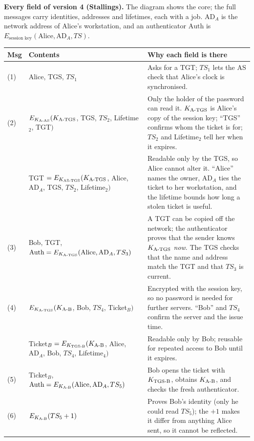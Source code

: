 \textbf{Every field of version 4 (Stallings).} The diagram shows the core; the full messages carry identities, addresses and lifetimes, each with a job. $\text{AD}_A$ is the network address of Alice's workstation, and an authenticator $\text{Auth}$ is $E_{\text{session key}}(\text{Alice}, \text{AD}_A, TS)$.
\begin{center}\small
\begin{tabularx}{\textwidth}{@{}l>{\raggedright\arraybackslash}p{6.2cm}X@{}}
\toprule
Msg & Contents & Why each field is there\\
\midrule
(1) & Alice, TGS, $TS_1$ & Asks for a TGT; $TS_1$ lets the AS check that Alice's clock is synchronised.\\
(2) & $E_{K_{\text{A-AS}}}(K_{\text{A-TGS}}$, TGS, $TS_2$, Lifetime$_2$, TGT$)$ & Only the holder of the password can read it. $K_{\text{A-TGS}}$ is Alice's copy of the session key; ``TGS'' confirms whom the ticket is for; $TS_2$ and Lifetime$_2$ tell her when it expires.\\
 & TGT $= E_{K_{\text{AS-TGS}}}(K_{\text{A-TGS}}$, Alice, $\text{AD}_A$, TGS, $TS_2$, Lifetime$_2)$ & Readable only by the TGS, so Alice cannot alter it. ``Alice'' names the owner, $\text{AD}_A$ ties the ticket to her workstation, and the lifetime bounds how long a stolen ticket is useful.\\
(3) & Bob, TGT, $\text{Auth} = E_{K_{\text{A-TGS}}}(\text{Alice}, \text{AD}_A, TS_3)$ & A TGT can be copied off the network; the authenticator proves that the sender knows $K_{\text{A-TGS}}$ \emph{now}. The TGS checks that the name and address match the TGT and that $TS_3$ is current.\\
(4) & $E_{K_{\text{A-TGS}}}(K_{\text{A-B}}$, Bob, $TS_4$, Ticket$_B)$ & Encrypted with the session key, so no password is needed for further servers. ``Bob'' and $TS_4$ confirm the server and the issue time.\\
 & Ticket$_B = E_{K_{\text{TGS-B}}}(K_{\text{A-B}}$, Alice, $\text{AD}_A$, Bob, $TS_4$, Lifetime$_4)$ & Readable only by Bob; reusable for repeated access to Bob until it expires.\\
(5) & Ticket$_B$, $\text{Auth} = E_{K_{\text{A-B}}}(\text{Alice}, \text{AD}_A, TS_5)$ & Bob opens the ticket with $K_{\text{TGS-B}}$, obtains $K_{\text{A-B}}$, and checks the fresh authenticator.\\
(6) & $E_{K_{\text{A-B}}}(TS_5 + 1)$ & Proves Bob's identity (only he could read $TS_5$); the $+1$ makes it differ from anything Alice sent, so it cannot be reflected.\\
\bottomrule
\end{tabularx}
\end{center}

